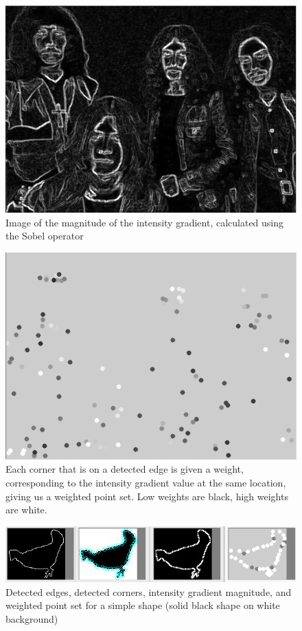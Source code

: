 \documentclass[10pt,a4paper]{article}
\begin{document}
\begin{figure}[ht!]
\centering
\includegraphics{sobel_intensity_gradient.png}
\caption{Image of the magnitude of the intensity gradient, calculated using the Sobel operator}
\label{overflow}
\end{figure}

\begin{figure}[ht!]
\centering
\includegraphics{weighted_point_set.png}
\caption{Each corner that is on a detected edge is given a weight, corresponding to the intensity gradient value at the same location, giving us a weighted point set. Low weights are black, high weights are white.}
\label{overflow}
\end{figure}

\begin{figure}[ht!]
\centering
\includegraphics{bird_points.png}
\caption{Detected edges, detected corners, intensity gradient magnitude, and weighted point set for a simple shape (solid black shape on white background)}
\label{overflow}
\end{figure}
\end{document}
